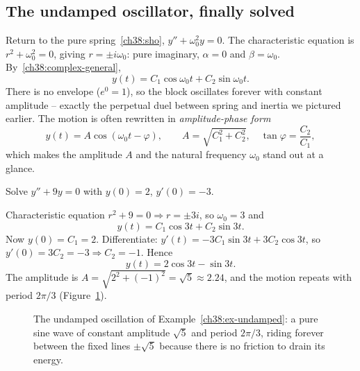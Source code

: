 \subsection*{The undamped oscillator, finally solved}

Return to the pure spring~\eqref{ch38:sho}, $y'' + \omega_0^2 y = 0$. The
characteristic equation is $r^2 + \omega_0^2 = 0$, giving $r = \pm i\omega_0$:
pure imaginary, $\alpha = 0$ and $\beta = \omega_0$. By~\eqref{ch38:complex-general},
\[
  y(t) = C_1 \cos\omega_0 t + C_2 \sin\omega_0 t.
\]
There is no envelope ($e^{0} = 1$), so the block oscillates forever with constant
amplitude -- exactly the perpetual duel between spring and inertia we pictured
earlier. The motion is often rewritten in \emph{amplitude-phase form}
\[
  y(t) = A\cos(\omega_0 t - \varphi),
  \qquad A = \sqrt{C_1^2 + C_2^2}, \quad \tan\varphi = \frac{C_2}{C_1},
\]
which makes the amplitude $A$ and the natural frequency $\omega_0$ stand out at a
glance.

\begin{example}
\label{ch38:ex-undamped}
Solve $y'' + 9y = 0$ with $y(0) = 2$, $y'(0) = -3$.

Characteristic equation $r^2 + 9 = 0 \Rightarrow r = \pm 3i$, so $\omega_0 = 3$
and
\[
  y(t) = C_1 \cos 3t + C_2 \sin 3t.
\]
Now $y(0) = C_1 = 2$. Differentiate: $y'(t) = -3C_1 \sin 3t + 3 C_2 \cos 3t$, so
$y'(0) = 3 C_2 = -3 \Rightarrow C_2 = -1$. Hence
\[
  y(t) = 2\cos 3t - \sin 3t.
\]
The amplitude is $A = \sqrt{2^2 + (-1)^2} = \sqrt 5 \approx 2.24$, and the motion
repeats with period $2\pi/3$ (Figure~\ref{ch38:fig-undamped}).
\end{example}

\begin{figure}[H]
\centering
{}
\caption{The undamped oscillation of Example~\ref{ch38:ex-undamped}: a pure sine
wave of constant amplitude $\sqrt5$ and period $2\pi/3$, riding forever between
the fixed lines $\pm\sqrt5$ because there is no friction to drain its energy.}
\label{ch38:fig-undamped}
\end{figure}

